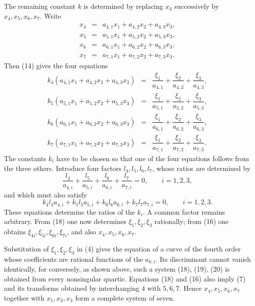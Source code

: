 \documentclass[11pt]{article}
\begin{document}
The remaining constant \(k\) is determined by replacing \(x_4\) successively by \(x_4,x_5,x_6,x_7\). Write
\begin{equation}
\begin{array}{rcl}
 x_4&=&a_{4,1}x_1+a_{4,2}x_2+a_{4,3}x_3,\\
 x_5&=&a_{5,1}x_1+a_{5,2}x_2+a_{5,3}x_3,\\
 x_6&=&a_{6,1}x_1+a_{6,2}x_2+a_{6,3}x_3,\\
 x_7&=&a_{7,1}x_1+a_{7,2}x_2+a_{7,3}x_3.
\end{array}
\tag{17}
\end{equation}
Then (14) gives the four equations
\begin{equation}
\begin{array}{rcl}
 k_4(a_{4,1}x_1+a_{4,2}x_2+a_{4,3}x_3)&=&\dfrac{\xi_1}{a_{4,1}}+\dfrac{\xi_2}{a_{4,2}}+\dfrac{\xi_3}{a_{4,3}},\\[0.8em]
 k_5(a_{5,1}x_1+a_{5,2}x_2+a_{5,3}x_3)&=&\dfrac{\xi_1}{a_{5,1}}+\dfrac{\xi_2}{a_{5,2}}+\dfrac{\xi_3}{a_{5,3}},\\[0.8em]
 k_6(a_{6,1}x_1+a_{6,2}x_2+a_{6,3}x_3)&=&\dfrac{\xi_1}{a_{6,1}}+\dfrac{\xi_2}{a_{6,2}}+\dfrac{\xi_3}{a_{6,3}},\\[0.8em]
 k_7(a_{7,1}x_1+a_{7,2}x_2+a_{7,3}x_3)&=&\dfrac{\xi_1}{a_{7,1}}+\dfrac{\xi_2}{a_{7,2}}+\dfrac{\xi_3}{a_{7,3}}.
\end{array}
\tag{18}
\end{equation}
The constants \(k_i\) have to be chosen so that one of the four equations follows from the three others. Introduce four factors \(l_4,l_5,l_6,l_7\), whose ratios are determined by
\begin{equation}
 \frac{l_4}{a_{4,i}}+\frac{l_5}{a_{5,i}}+\frac{l_6}{a_{6,i}}+\frac{l_7}{a_{7,i}}=0,
 \qquad i=1,2,3,
 \tag{19}
\end{equation}
and which must also satisfy
\begin{equation}
 k_4l_4a_{4,i}+k_5l_5a_{5,i}+k_6l_6a_{6,i}+k_7l_7a_{7,i}=0,
 \qquad i=1,2,3.
 \tag{20}
\end{equation}
These equations determine the ratios of the \(k_i\). A common factor remains arbitrary. From (18) one now determines \(\xi_1,\xi_2,\xi_3\) rationally; from (16) one obtains \(\xi_{4i},\xi_{5i},\xi_{6i},\xi_{7i}\), and also \(x_4,x_5,x_6,x_7\).

Substitution of \(\xi_1,\xi_2,\xi_3\) in (4) gives the equation of a curve of the fourth order whose coefficients are rational functions of the \(a_{k,i}\). Its discriminant cannot vanish identically, for conversely, as shown above, such a system (18), (19), (20) is obtained from every nonsingular quartic. Equations (18) and (16) also imply (7) and its transforms obtained by interchanging \(4\) with \(5,6,7\). Hence \(x_4,x_5,x_6,x_7\) together with \(x_1,x_2,x_3\) form a complete system of seven.
\end{document}
